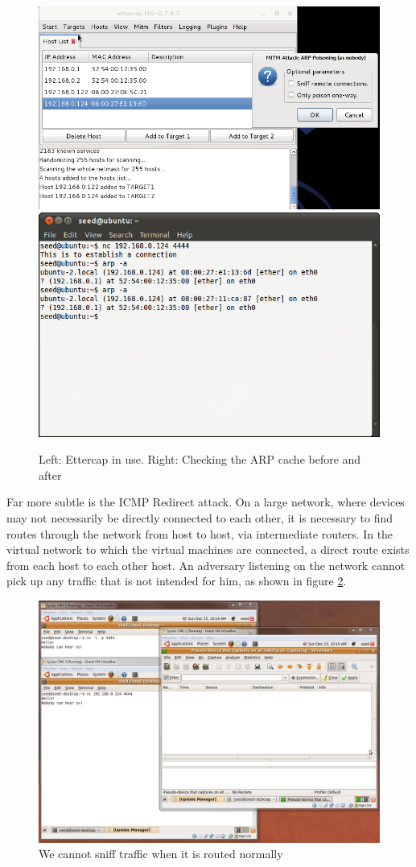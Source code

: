 \begin{figure}[h]
    \centering
    \includegraphics[width=.5\linewidth]{images/ettercap.png} \includegraphics[width=.45\linewidth]{images/arp.png}
    \caption{Left: Ettercap in use. Right: Checking the ARP cache before and after}
    \label{fig:etterarp}
\end{figure}

Far more subtle is the ICMP Redirect attack. On a large network, where devices may not necessarily be directly connected
to each other, it is necessary to find routes through the network from host to host, via intermediate routers. In the
virtual network to which the virtual machines are connected, a direct route exists from each host to each other host. An
adversary listening on the network cannot pick up any traffic that is not intended for him, as shown in figure
\ref{fig:icmp_before}.

\begin{figure}[h]
    \centering
    \includegraphics[width=.7\linewidth]{images/icmp_redirect_before.png}
    \caption{We cannot sniff traffic when it is routed normally} \label{fig:icmp_before}
\end{figure}

